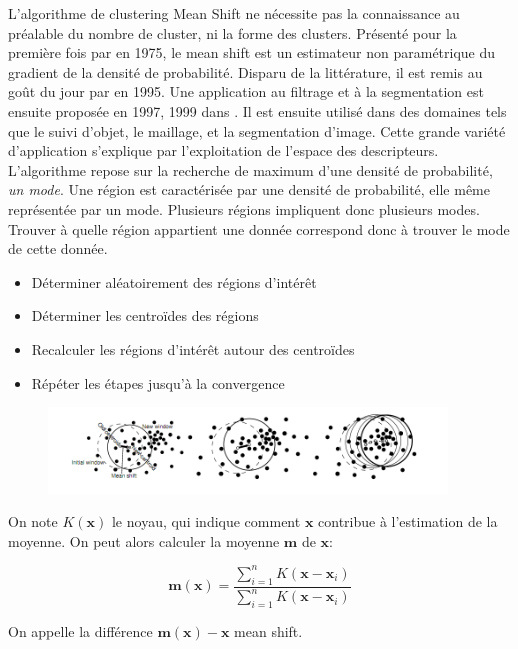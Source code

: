 \documentclass{article}
\begin{document}
L'algorithme de clustering Mean Shift ne nécessite pas la connaissance au
préalable du nombre de cluster, ni la forme des clusters. Présenté pour la
première fois par \cite{fukugana} en 1975, le mean shift est un estimateur non
paramétrique du gradient de la densité de probabilité. Disparu de la
littérature, il est remis au goût du jour par \cite{cheng} en 1995. Une
application au filtrage et à la segmentation est ensuite proposée en 1997,
1999 dans \cite{comaniciu_meer}. Il est ensuite utilisé dans des domaines tels
que le suivi d'objet, le maillage, et la segmentation d'image. Cette grande
variété d'application s'explique par l'exploitation de l'espace des
descripteurs. \\
L'algorithme repose sur la recherche de maximum d'une densité de probabilité,
\textit{un mode}. Une région est caractérisée par une densité de probabilité,
elle même représentée par un mode. Plusieurs régions impliquent donc plusieurs
modes. Trouver à quelle région appartient une donnée correspond donc à trouver
le mode de cette donnée.

\begin{itemize}
\item Déterminer aléatoirement des régions d'intérêt
\item Déterminer les centroïdes des régions
\item Recalculer les régions d'intérêt autour des centroïdes
\item Répéter les étapes jusqu'à la convergence
\end{itemize}

\begin{figure}
\includegraphics[width=400px]{images/mean_shift_proc.png}
\end{figure}

On note $K(\mathbf{x})$ le noyau, qui indique comment $\mathbf{x}$ contribue à
l'estimation de la moyenne. On peut alors calculer la moyenne $\mathbf{m}$ de
$\mathbf{x}$:

\begin{equation*}
\mathbf{m}(\mathbf{x}) = \frac{\sum_{i = 1}^n K (\mathbf{x} - \mathbf{x}_i)}{\sum_{i =
1}^n K (\mathbf{x} - \mathbf{x}_i)}
\end{equation*}

On appelle la différence $\mathbf{m}(\mathbf{x}) - \mathbf{x}$ mean shift.
\end{document}
